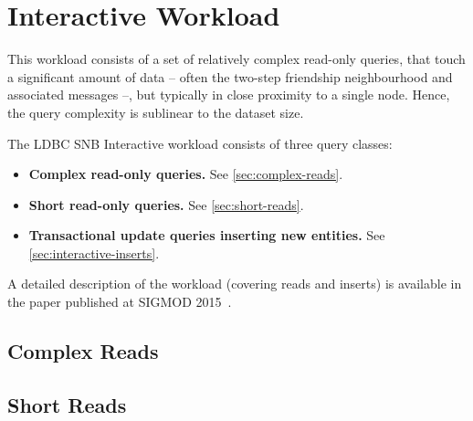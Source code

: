 \chapter{Interactive Workload}
\label{section:interactive}

This workload consists of a set of relatively complex read-only queries, that touch a significant
amount of data -- often the two-step friendship neighbourhood and associated messages --, but typically in close proximity to a single node. Hence, the query complexity is sublinear to the dataset size.

The LDBC SNB Interactive workload consists of three query classes:

\begin{itemize}
\item \textbf{Complex read-only queries.} See \autoref{sec:complex-reads}.
\item \textbf{Short read-only queries.} See \autoref{sec:short-reads}.
\item \textbf{Transactional update queries inserting new entities.} See \autoref{sec:interactive-inserts}.
\end{itemize}

A detailed description of the workload (covering reads and inserts) is available in the paper published at \mbox{SIGMOD} 2015~\cite{DBLP:conf/sigmod/ErlingALCGPPB15}.


\section{Complex Reads}
\label{sec:complex-reads}




\section{Short Reads}
\label{sec:short-reads}



